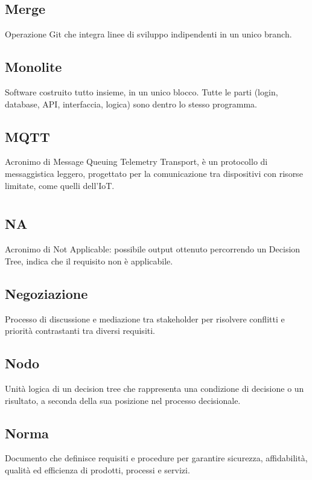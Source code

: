 \documentclass[a4paper,12pt]{article}
\begin{document}
          \subsection*{Merge}
			Operazione Git che integra linee di sviluppo indipendenti in un unico branch.
          \subsection*{Monolite}
			Software costruito tutto insieme, in un unico blocco. Tutte le parti (login, database, API, interfaccia, logica) sono dentro lo stesso programma.
          \subsection*{MQTT}
			Acronimo di Message Queuing Telemetry Transport, è un protocollo di messaggistica leggero, progettato per la comunicazione tra dispositivi con risorse limitate, come quelli dell'IoT.
        
\newpage
        \section{}
        
          \subsection*{NA}
			Acronimo di Not Applicable: possibile output ottenuto percorrendo un Decision Tree, indica che il requisito non è applicabile.
          \subsection*{Negoziazione}
			Processo di discussione e mediazione tra stakeholder per risolvere conflitti e priorità contrastanti tra diversi requisiti.
          \subsection*{Nodo}
			Unità logica di un decision tree che rappresenta una condizione di decisione o un risultato, a seconda della sua posizione nel processo decisionale.
          \subsection*{Norma}
			Documento che definisce requisiti e procedure per garantire sicurezza, affidabilità, qualità ed efficienza di prodotti, processi e servizi.
        
\end{document}
